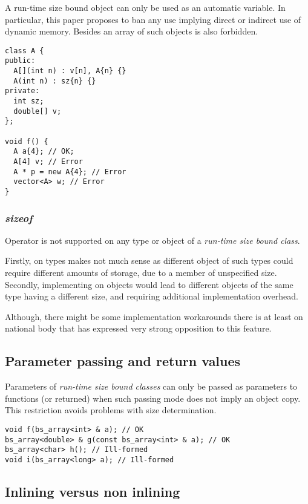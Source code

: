 A run-time size bound object can only be used as an automatic variable.
In particular, this paper proposes to ban any use implying direct or indirect
use of dynamic memory. Besides an array of such objects is also forbidden.

\begin{lstlisting}
class A {
public:
  A[](int n) : v[n], A{n} {}
  A(int n) : sz{n} {}
private:
  int sz;
  double[] v;
};

void f() {
  A a{4}; // OK;
  A[4] v; // Error
  A * p = new A{4}; // Error
  vector<A> w; // Error
}
\end{lstlisting}

\subsubsection{\emph{sizeof}}

Operator  is not supported on any type or object of a \emph{run-time size bound class}.

Firstly, on types  makes not much sense as different object of such types could require
different amounts of storage, due to a member of unspecified size. Secondly, implementing 
on objects would lead to different objects of the same type having a different size, and requiring
additional implementation overhead.

Although, there might be some implementation workarounds there is at least on national body
that has expressed very strong opposition to this feature.

\subsection{Parameter passing and return values}

Parameters of \emph{run-time size bound classes} can only be passed as parameters to functions (or returned)
when such passing mode does not imply an object copy. This restriction avoids problems with size determination.

\begin{lstlisting}
void f(bs_array<int> & a); // OK
bs_array<double> & g(const bs_array<int> & a); // OK
bs_array<char> h(); // Ill-formed
void i(bs_array<long> a); // Ill-formed
\end{lstlisting}

\subsection{Inlining versus non inlining}

